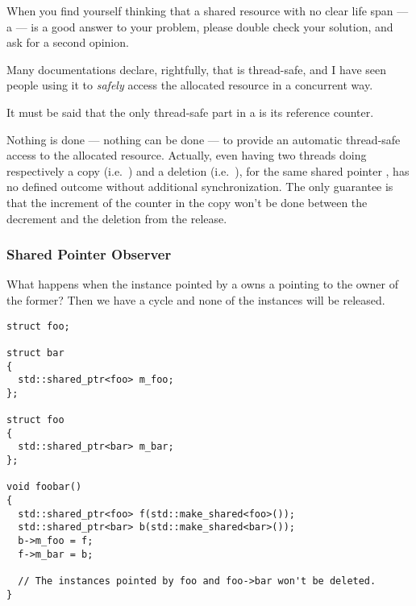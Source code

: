 \begin{guideline}
When you find yourself thinking that a shared resource with no clear
life span — a  — is a good answer to your
problem, please double check your solution, and ask for a second
opinion.
\end{guideline}

\begin{pitfall}
Many documentations declare, rightfully, that 
is thread-safe, and I have seen people using it to \emph{safely}
access the allocated resource in a concurrent way.

\bigskip

It must be said that the only thread-safe part in a
 is its reference counter.

\bigskip

Nothing is done — nothing can be done — to provide an automatic
thread-safe access to the allocated resource. Actually, even having
two threads doing respectively a copy (i.e.\ ) and a deletion (i.e.\ ), for the same
shared pointer , has no defined outcome without additional
synchronization. The only guarantee is that the increment of the
counter in the copy won't be done between the decrement and the
deletion from the release.

\end{pitfall}

\subsubsection{Shared Pointer Observer}

%
%
What happens when the instance pointed by a 
owns a  pointing to the owner of the former?
Then we have a cycle and none of the instances will be released.

\begin{lstlisting}
struct foo;

struct bar
{
  std::shared_ptr<foo> m_foo;
};

struct foo
{
  std::shared_ptr<bar> m_bar;
};

void foobar()
{
  std::shared_ptr<foo> f(std::make_shared<foo>());
  std::shared_ptr<bar> b(std::make_shared<bar>());
  b->m_foo = f;
  f->m_bar = b;

  // The instances pointed by foo and foo->bar won't be deleted.
}
\end{lstlisting}

